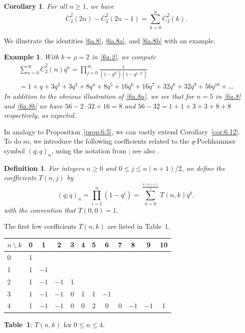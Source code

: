 \documentclass{amsart}
\theoremstyle{plain}
\newtheorem{corollary}[theorem]{Corollary}
\newtheorem{definition}[theorem]{Definition}
\newtheorem{example}[theorem]{Example}
\numberwithin{equation}{section}
\begin{document}
\begin{corollary}\label{cor:6.12a}
For all $n\geq 1$, we have
\begin{equation}\label{6a.8b}
\overline{C}_2^2(2n)-\overline{C}_2^2(2n-1)
=\sum_{k=0}^n\overline{C}_2^2(k).
\end{equation}
\end{corollary}

We illustrate the identities \eqref{6a.8}, \eqref{6a.8a}, and \eqref{6a.8b}
with an example.

\begin{example}\label{ex:6.12}
{\rm With $b=\rho=2$ in \eqref{6a.2}, we compute
\begin{gather}
\sum_{n=0}^\infty\overline{C}_2^2(n)q^n
=\prod_{j=0}^\infty\frac{1}{\left(1-q^{2^j}\right)\left(1-q^{2\cdot 2^j}\right)}\label{6a.9} \\
=1+q+3q^2+3q^3+8q^4+8q^5+16q^6+16q^7+32q^8+32q^9+56q^{10}+\dots \nonumber
\end{gather}
In addition to the obvious illustration of \eqref{6a.8a}, we see that for 
$n=5$ in \eqref{6a.8} and \eqref{6a.8b} we have $56-2\cdot 32+16=8$ and
$56-32=1+1+3+3+8+8$ respectively, as expected.}
\end{example}

In analogy to Proposition~\ref{prop:6.5}, we can vastly extend 
Corollary~\ref{cor:6.12}. To do so, we introduce the following coefficients
related to the $q$-Pochhammer symbol $(q;q)_n$, using the notation from
\cite[A231599]{OEIS}; see also \cite[A333290]{OEIS}.

\begin{definition}\label{def:6.14}
{\rm For integers $n\geq 0$ and $0\leq j\leq n(n+1)/2$, we define the
coefficients $T(n,j)$ by
\begin{equation}\label{6a.10}
(q;q)_n = \prod_{i=1}^n\left(1-q^i\right)
= \sum_{k=0}^{\frac{n(n+1)}{2}}T(n,k)q^k,
\end{equation}
with the convention that $T(0,0)=1$.}
\end{definition}

The first few coefficients $T(n,k)$ are listed in Table~1.

\bigskip
\begin{center}
{\renewcommand{\arraystretch}{1.1}
\begin{tabular}{|l|c c c c c c c c c c c|}
\hline
$n \backslash k$ & 0 & 1 & 2 & 3 & 4 & 5 & 6 & 7 & 8 & 9 & 10 \\
\hline
0 & 1 & & & & & & & & & &\\
1 & 1 & $-1$ & & & & & & & & &\\
2 & 1 & $-1$ & $-1$ & 1 & & & & & & & \\
3 & 1 & $-1$ & $-1$ & 0 & 1 & 1 & $-1$ & & & & \\
4 & 1 & $-1$ & $-1$ & 0 & 0 & 2 & 0 & 0 & $-1$ & $-1$ & 1 \\
\hline
\end{tabular}}

\medskip
{\bf Table~1}: $T(n,k)$ for $0\leq n\leq 4$.
\end{center}
\end{document}
